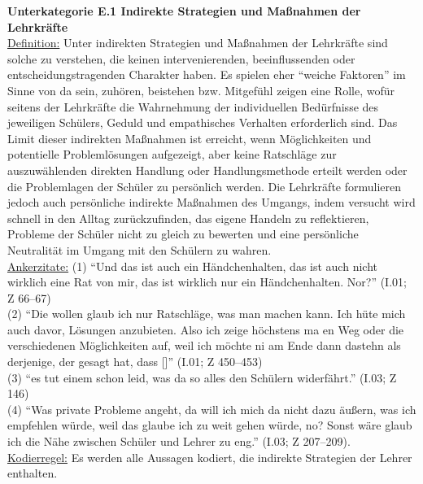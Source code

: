 \noindent
\textbf{Unterkategorie E.1 Indirekte Strategien und Maßnahmen der Lehrkräfte}\\
\underline{Definition:} Unter indirekten Strategien und Maßnahmen der Lehrkräfte sind solche zu verstehen, die keinen intervenierenden, beeinflussenden oder entscheidungstragenden Charakter haben. Es spielen eher "`weiche Faktoren"' im Sinne von da sein, zuhören, beistehen bzw. Mitgefühl zeigen eine Rolle, wofür seitens der Lehrkräfte die Wahrnehmung der individuellen Bedürfnisse des jeweiligen Schülers, Geduld und empathisches Verhalten erforderlich sind. Das Limit dieser indirekten Maßnahmen ist erreicht, wenn Möglichkeiten und potentielle Problemlösungen aufgezeigt, aber keine Ratschläge zur auszuwählenden direkten Handlung oder Handlungsmethode erteilt werden oder die Problemlagen der Schüler zu persönlich werden. Die Lehrkräfte formulieren jedoch auch persönliche indirekte Maßnahmen des Umgangs, indem versucht wird schnell in den Alltag zurückzufinden, das eigene Handeln zu reflektieren, Probleme der Schüler nicht zu gleich zu bewerten und eine persönliche Neutralität im Umgang mit den Schülern zu wahren.\\
\underline{Ankerzitate:} (1) "`Und das ist auch ein Händchenhalten, das ist auch nicht wirklich eine Rat von mir, das ist wirklich nur ein Händchenhalten. Nor?"' (I.01; Z 66--67)\\ (2) "`Die wollen glaub ich nur Ratschläge, was man machen kann. Ich hüte mich auch davor, Lösungen anzubieten. Also ich zeige höchstens ma en Weg oder die verschiedenen Möglichkeiten auf, weil ich möchte ni am Ende dann dastehn als derjenige, der gesagt hat, dass [\punkte]"' (I.01; Z 450--453)\\ (3) "`es tut einem schon leid, was da so alles den Schülern widerfährt."' (I.03; Z 146)\\ (4) "`Was private Probleme angeht, da will ich mich da nicht dazu äußern, was ich empfehlen würde, weil das glaube ich zu weit gehen würde, no? Sonst wäre glaub ich die Nähe zwischen Schüler und Lehrer zu eng."' (I.03; Z 207--209).\\
\underline{Kodierregel:} Es werden alle Aussagen kodiert, die indirekte Strategien der Lehrer enthalten.\\

